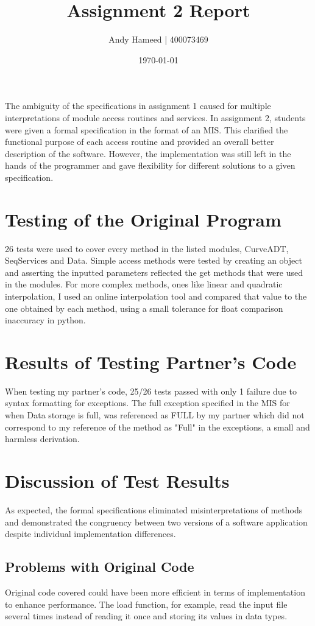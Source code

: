 \documentclass[12pt]{article}
\title{Assignment 2 Report}
\author{Andy Hameed | 400073469}
\date{\today}
\begin{document}
\maketitle

The ambiguity of the specifications in assignment 1 caused for multiple interpretations of module access routines and services. In assignment 2, students were given a formal specification in the format of an MIS. This clarified the functional purpose of each access routine and provided an overall better description of the software. However, the implementation was still left in the hands of the programmer and gave flexibility for different solutions to a given specification.

\section{Testing of the Original Program}

26 tests were used to cover every method in the listed modules, CurveADT, SeqServices and Data. Simple access methods were tested by creating an object and asserting the inputted parameters reflected the get methods that were used in the modules. For more complex methods, ones like linear and quadratic interpolation, I used an online interpolation tool and compared that value to the one obtained by each method, using a small tolerance for float comparison inaccuracy in python.

\section{Results of Testing Partner's Code}

When testing my partner's code, 25/26 tests passed with only 1 failure due to syntax formatting for exceptions. The full exception specified in the MIS for when Data storage is full, was referenced as FULL by my partner which did not correspond to my reference of the method as "Full" in the exceptions, a small and harmless derivation.

\section{Discussion of Test Results}
As expected, the formal specifications eliminated misinterpretations of methods and demonstrated the congruency between two versions of a software application despite individual implementation differences. 

\subsection{Problems with Original Code}
Original code covered could have been more efficient in terms of implementation to enhance performance. The load function, for example, read the input file several times instead of reading it once and storing its values in data types. 
\end{document}
